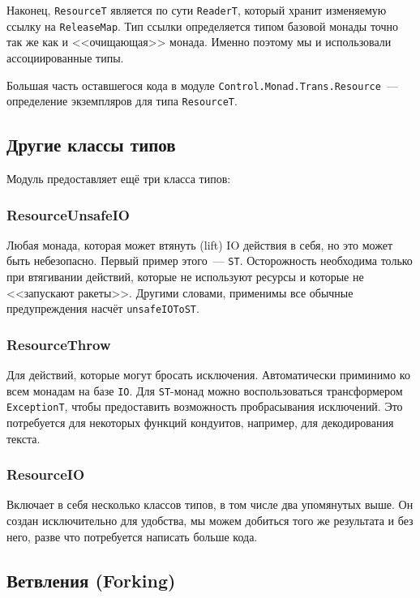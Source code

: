 Наконец, \lstinline'ResourceT' является по сути \lstinline'ReaderT', который
хранит изменяемую
ссылку на \lstinline'ReleaseMap'. Тип ссылки определяется типом базовой монады точно так же как и <<очищающая>> монада. Именно поэтому мы и использовали ассоциированные типы.

Большая часть оставшегося кода в модуле \lstinline'Control.Monad.Trans.Resource'~---
определение экземпляров для типа \lstinline'ResourceT'.

\subsection{Другие классы типов}

Модуль предоставляет ещё три класса типов:
   
\subsubsection{ResourceUnsafeIO}
Любая монада, которая может втянуть (lift) IO действия в себя, но это может быть небезопасно.
Первый пример этого~--- \lstinline'ST'. Осторожность необходима только при втягивании действий, которые не используют ресурсы и которые не <<запускают ракеты>>.
Другими словами, применимы все обычные предупреждения насчёт \lstinline'unsafeIOToST'.
  
\subsubsection{ResourceThrow}

Для действий, которые могут бросать исключения. Автоматически приминимо ко всем
монадам на базе \lstinline{IO}. Для \lstinline{ST}-монад можно воспользоваться трансформером
\lstinline'ExceptionT', чтобы
предоставить возможность пробрасывания исключений. Это потребуется для некоторых функций
кондуитов, например, для декодирования текста.
   
\subsubsection{ResourceIO}

Включает в себя несколько классов типов, в том числе два
упомянутых выше. Он создан исключительно для удобства, мы можем добиться того же результата и без него,
разве что потребуется написать больше кода.
   
\subsection{Ветвления (Forking)}

